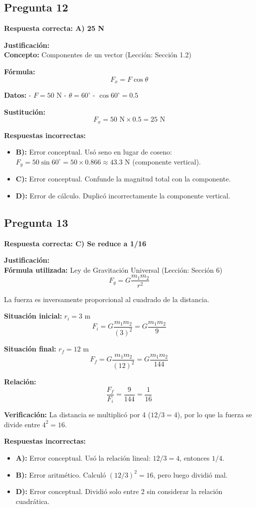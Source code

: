 \begin{respuestabox}
\subsection{Pregunta 12}
\textcolor{verdecorrecto}{\textbf{Respuesta correcta: A) 25 N}}

\textbf{Justificación:}\\
\textbf{Concepto:} Componentes de un vector (Lección: Sección 1.2)

\textbf{Fórmula:}
$$F_x = F \cos\theta$$

\textbf{Datos:}
- $F = 50$ N
- $\theta = 60^\circ$
- $\cos 60^\circ = 0.5$

\textbf{Sustitución:}
$$F_x = 50 \text{ N} \times 0.5 = 25 \text{ N}$$

\textbf{Respuestas incorrectas:}
\begin{itemize}
    \item \textbf{B):} Error conceptual. Usó seno en lugar de coseno: $F_y = 50 \sin 60^\circ = 50 \times 0.866 \approx 43.3$ N (componente vertical).
    \item \textbf{C):} Error conceptual. Confunde la magnitud total con la componente.
    \item \textbf{D):} Error de cálculo. Duplicó incorrectamente la componente vertical.
\end{itemize}
\end{respuestabox}
\newpage
\begin{respuestabox}
\subsection{Pregunta 13}
\textcolor{verdecorrecto}{\textbf{Respuesta correcta: C) Se reduce a 1/16}}

\textbf{Justificación:}\\
\textbf{Fórmula utilizada:} Ley de Gravitación Universal (Lección: Sección 6)
$$F_g = G\frac{m_1 m_2}{r^2}$$

La fuerza es inversamente proporcional al cuadrado de la distancia.

\textbf{Situación inicial:} $r_i = 3$ m
$$F_i = G\frac{m_1 m_2}{(3)^2} = G\frac{m_1 m_2}{9}$$

\textbf{Situación final:} $r_f = 12$ m
$$F_f = G\frac{m_1 m_2}{(12)^2} = G\frac{m_1 m_2}{144}$$

\textbf{Relación:}
$$\frac{F_f}{F_i} = \frac{9}{144} = \frac{1}{16}$$

\textbf{Verificación:} La distancia se multiplicó por 4 ($12/3 = 4$), por lo que la fuerza se divide entre $4^2 = 16$.

\textbf{Respuestas incorrectas:}
\begin{itemize}
    \item \textbf{A):} Error conceptual. Usó la relación lineal: $12/3 = 4$, entonces $1/4$.
    \item \textbf{B):} Error aritmético. Calculó $(12/3)^2 = 16$, pero luego dividió mal.
    \item \textbf{D):} Error conceptual. Dividió solo entre 2 sin considerar la relación cuadrática.
\end{itemize}
\end{respuestabox}

